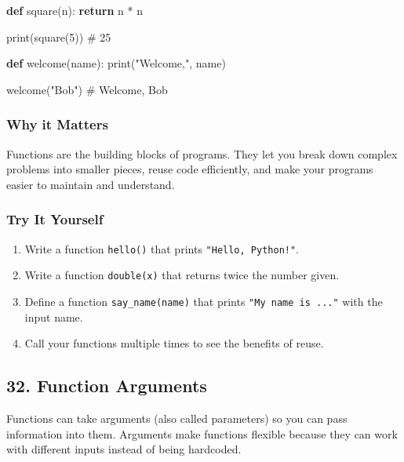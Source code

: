 \documentclass[
  letterpaper,
  DIV=11,
  numbers=noendperiod]{scrreprt}
\newenvironment{Shaded}{\begin{snugshade}}{\end{snugshade}}
\newcommand{\BuiltInTok}[1]{\textcolor[rgb]{0.00,0.23,0.31}{#1}}
\newcommand{\CommentTok}[1]{\textcolor[rgb]{0.37,0.37,0.37}{#1}}
\newcommand{\ControlFlowTok}[1]{\textcolor[rgb]{0.00,0.23,0.31}{\textbf{#1}}}
\newcommand{\DecValTok}[1]{\textcolor[rgb]{0.68,0.00,0.00}{#1}}
\newcommand{\KeywordTok}[1]{\textcolor[rgb]{0.00,0.23,0.31}{\textbf{#1}}}
\newcommand{\NormalTok}[1]{\textcolor[rgb]{0.00,0.23,0.31}{#1}}
\newcommand{\OperatorTok}[1]{\textcolor[rgb]{0.37,0.37,0.37}{#1}}
\newcommand{\StringTok}[1]{\textcolor[rgb]{0.13,0.47,0.30}{#1}}
\providecommand{\tightlist}{%
  \setlength{\itemsep}{0pt}\setlength{\parskip}{0pt}}
\begin{document}
\begin{Shaded}
\begin{Highlighting}[]
\KeywordTok{def}\NormalTok{ square(n):}
    \ControlFlowTok{return}\NormalTok{ n }\OperatorTok{*}\NormalTok{ n}

\BuiltInTok{print}\NormalTok{(square(}\DecValTok{5}\NormalTok{))   }\CommentTok{\# 25}

\KeywordTok{def}\NormalTok{ welcome(name):}
    \BuiltInTok{print}\NormalTok{(}\StringTok{"Welcome,"}\NormalTok{, name)}

\NormalTok{welcome(}\StringTok{"Bob"}\NormalTok{)     }\CommentTok{\# Welcome, Bob}
\end{Highlighting}
\end{Shaded}

\subsubsection{Why it Matters}\label{why-it-matters-30}

Functions are the building blocks of programs. They let you break down
complex problems into smaller pieces, reuse code efficiently, and make
your programs easier to maintain and understand.

\subsubsection{Try It Yourself}\label{try-it-yourself-30}

\begin{enumerate}
\def\labelenumi{\arabic{enumi}.}
\tightlist
\item
  Write a function \texttt{hello()} that prints
  \texttt{"Hello,\ Python!"}.
\item
  Write a function \texttt{double(x)} that returns twice the number
  given.
\item
  Define a function \texttt{say\_name(name)} that prints
  \texttt{"My\ name\ is\ ..."} with the input name.
\item
  Call your functions multiple times to see the benefits of reuse.
\end{enumerate}

\subsection{32. Function Arguments}\label{function-arguments}

Functions can take arguments (also called parameters) so you can pass
information into them. Arguments make functions flexible because they
can work with different inputs instead of being hardcoded.
\end{document}

